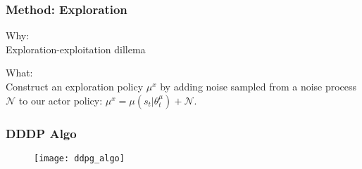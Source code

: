 \begin{frame}
\frametitle{Method: Exploration}
Why:\\
Exploration-exploitation dillema

What:\\
Construct an exploration policy $\mu^x$ by adding noise sampled from
a noise process $\mathcal{N}$ to our actor policy:
$\mu^x = \mu(s_t | \theta^{\mu}_t) + \mathcal{N}$.

\end{frame}

\begin{frame}
\frametitle{DDDP Algo}
\begin{figure}
    \centering
    \texttt{[image: ddpg\_algo]}
\end{figure}
\end{frame}
